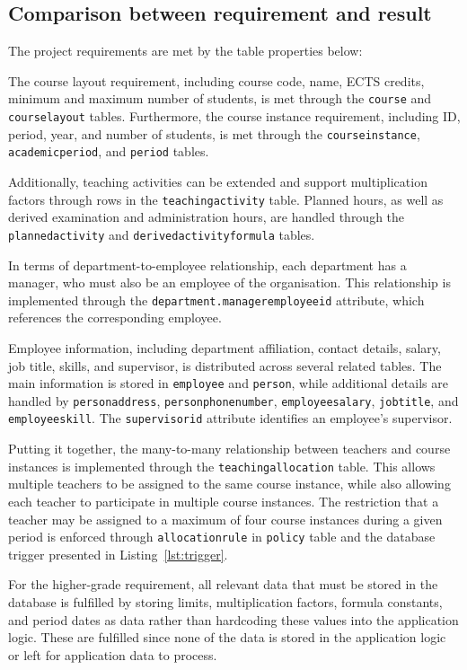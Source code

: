 \documentclass[a4paper]{scrartcl}
\renewcommand{\_}{\textunderscore\allowbreak}
\begin{document}
\subsection{Comparison between requirement and result}

The project requirements are met by the table properties below:

The course layout requirement, including course code, name, ECTS credits, minimum and maximum number of students, is met through the \texttt{course} and \texttt{course\_layout} tables. Furthermore, the course instance requirement, including ID, period, year, and number of students, is met through the \texttt{course\_instance}, \texttt{academic\_period}, and \texttt{period} tables.

Additionally, teaching activities can be extended and support multiplication factors through rows in the \texttt{teaching\_activity} table. Planned hours, as well as derived examination and administration hours, are handled through the \texttt{planned\_activity} and \texttt{derived\_activity\_formula} tables.

In terms of department-to-employee relationship, each department has a manager, who must also be an employee of the organisation. This relationship is implemented through the \texttt{department.manager\_employee\_id} attribute, which references the corresponding employee.

Employee information, including department affiliation, contact details, salary, job title, skills, and supervisor, is distributed across several related tables. The main information is stored in \texttt{employee} and \texttt{person}, while additional details are handled by \texttt{person\_address}, \texttt{person\_phone\_number}, \texttt{employee\_salary}, \texttt{job\_title}, and \texttt{employee\_skill}. The \texttt{supervisor\_id} attribute identifies an employee's supervisor.

Putting it together, the many-to-many relationship between teachers and course instances is implemented through the \texttt{teaching\_allocation} table. This allows multiple teachers to be assigned to the same course instance, while also allowing each teacher to participate in multiple course instances. The restriction that a teacher may be assigned to a maximum of four course instances during a given period is enforced through \texttt{allocation\_rule} in \texttt{policy} table and the database trigger presented in Listing~\ref{lst:trigger}.

For the higher-grade requirement, all relevant data that must be stored in the database is fulfilled by storing limits, multiplication factors, formula constants, and period dates as data rather than hardcoding these values into the application logic. These are fulfilled since none of the data is stored in the application logic or left for application data to process.
\end{document}
